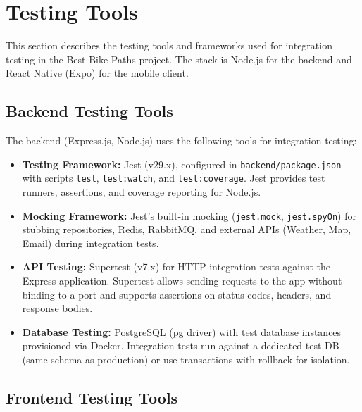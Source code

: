 \section{Testing Tools}
\label{sec:testing_tools}%

This section describes the testing tools and frameworks used for integration testing in the Best Bike Paths project. The stack is Node.js for the backend and React Native (Expo) for the mobile client.

\subsection{Backend Testing Tools}
\label{subsec:backend_testing_tools}%

The backend (Express.js, Node.js) uses the following tools for integration testing:
\begin{itemize}
    \item \textbf{Testing Framework:} Jest (v29.x), configured in \texttt{backend/package.json} with scripts \texttt{test}, \texttt{test:watch}, and \texttt{test:coverage}. Jest provides test runners, assertions, and coverage reporting for Node.js.
    \item \textbf{Mocking Framework:} Jest's built-in mocking (\texttt{jest.mock}, \texttt{jest.spyOn}) for stubbing repositories, Redis, RabbitMQ, and external APIs (Weather, Map, Email) during integration tests.
    \item \textbf{API Testing:} Supertest (v7.x) for HTTP integration tests against the Express application. Supertest allows sending requests to the app without binding to a port and supports assertions on status codes, headers, and response bodies.
    \item \textbf{Database Testing:} PostgreSQL (pg driver) with test database instances provisioned via Docker. Integration tests run against a dedicated test DB (same schema as production) or use transactions with rollback for isolation.
\end{itemize}

\subsection{Frontend Testing Tools}
\label{subsec:frontend_testing_tools}%


